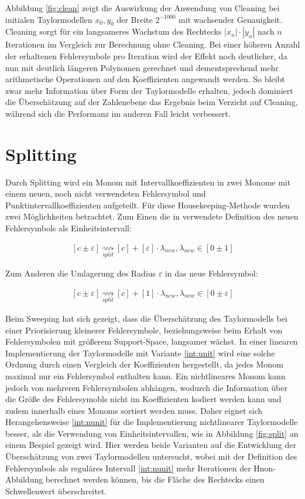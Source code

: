  Abbildung \ref{fig:clean} zeigt die Auswirkung der Anwendung von Cleaning bei initialen Taylormodellen $x_0, y_0$ der Breite $2^{-1000}$ mit wachsender Genauigkeit. Cleaning sorgt für ein langsameres Wachstum des Rechtecks $|x_n|\cdot|y_n|$ nach $n$ Iterationen im Vergleich zur Berechnung ohne Cleaning. Bei einer höheren Anzahl der erhaltenen Fehlersymbole pro Iteration wird der Effekt noch deutlicher, da nun mit deutlich längeren Polynomen gerechnet und dementsprechend mehr arithmetische Operationen auf den Koeffizienten angewandt werden. So bleibt zwar mehr Information über Form der Taylormodelle erhalten, jedoch dominiert die Überschätzung auf der Zahlenebene das Ergebnis beim Verzicht auf Cleaning, während sich die Performanz im anderen Fall leicht verbessert.
 

 
 
 \section{Splitting}
 Durch Splitting wird ein Monom mit Intervallkoeffizienten in zwei Monome mit einem neuen, noch nicht verwendeten Fehlersymbol und Punktintervallkoeffizienten aufgeteilt. Für diese Housekeeping-Methode wurden zwei Möglichkeiten betrachtet. Zum Einen die in \cite{DBLP:conf/macis/BrausseKM15} verwendete Definition des neuen Fehlersymbols als Einheitsintervall:
 
\begin{align}
\label{int:unit}
 [c \pm \varepsilon]  \underset{split}{\rightsquigarrow} [c] + [\varepsilon] \cdot \lambda_{new}, \lambda_{new} \in [0 \pm 1]
\end{align}

Zum Anderen die Umlagerung des Radius $\varepsilon$ in das neue Fehlersymbol:

\begin{align}
\label{int:nunit}
 [c \pm \varepsilon]  \underset{split}{\rightsquigarrow} [c] + [1] \cdot \lambda_{new}, \lambda_{new} \in [0 \pm \varepsilon]
\end{align}
 
Beim Sweeping hat sich gezeigt, dass die Überschätzung des Taylormodells bei einer Priorisierung kleinerer Fehlersymbole, beziehungsweise beim Erhalt von Fehlersymbolen mit größerem Support-Space, langsamer wächst. In einer linearen Implementierung der Taylormodelle mit Variante \ref{int:unit} wird eine solche Ordnung durch einen Vergleich der Koeffizienten hergestellt, da jedes Monom maximal nur ein Fehlersymbol enthalten kann. Ein nichtlineares Monom kann jedoch von mehreren Fehlersymbolen abhängen, wodurch die Information über die Größe des Fehlersymobls nicht im Koeffizienten kodiert werden kann und zudem innerhalb eines Monoms sortiert werden muss. Daher eignet sich Herangehensweise \ref{int:nunit} für die Implementierung nichtlinearer Taylormodelle besser, als die Verwendung von Einheitsintervallen, wie in Abbildung \ref{fig:split} an einem Bespiel gezeigt wird. Hier werden beide Varianten auf die Entwicklung der Überschätzung von zwei Taylormodellen untersucht, wobei mit der Definition des Fehlersymbols als reguläres Intervall \ref{int:nunit} mehr Iterationen der H\e non-Abbildung berechnet werden können, bis die Fläche des Rechtecks einen Schwellenwert überschreitet.
 
